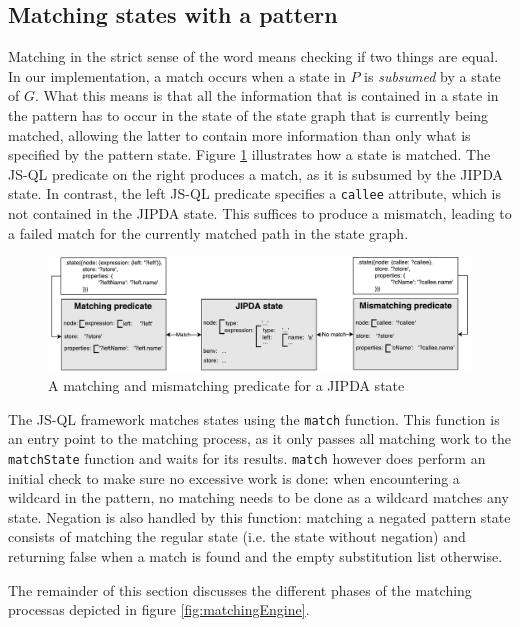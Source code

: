 \subsection{Matching states with a pattern}
\label{subsec:matching}

Matching in the strict sense of the word means checking if two things are equal. In our implementation, a match occurs when a state in $P$ is \textit{subsumed} by a state of $G$. What this means is that all the information that is contained in a state in the pattern has to occur in the state of the state graph that is currently being matched, allowing the latter to contain more information than only what is specified by the pattern state. Figure \ref{fig:matchingPredicates} illustrates how a state is matched. The JS-QL predicate on the right produces a match, as it is subsumed by the JIPDA state. In contrast, the left JS-QL predicate specifies a \texttt{callee} attribute, which is not contained in the JIPDA state. This suffices to produce a mismatch, leading to a failed match for the currently matched path in the state graph.
\begin{figure}[!h]
    \centering
      \includegraphics[width=1\textwidth]{images/matchingPredicates} 
      \caption{A matching and mismatching predicate for a JIPDA state}
    \label{fig:matchingPredicates}
\end{figure}

The JS-QL framework matches states using the \texttt{match} function. This function is an entry point to the matching process, as it only passes all matching work to the \texttt{matchState} function and waits for its results. \texttt{match} however does perform an initial check to make sure no excessive work is done: when encountering a wildcard in the pattern, no matching needs to be done as a wildcard matches any state. Negation is also handled by this function: matching a negated pattern state consists of matching the regular state (i.e. the state without negation) and returning false when a match is found and the empty substitution list otherwise. 

The remainder of this section discusses the different phases of the matching processas depicted in figure \ref{fig:matchingEngine}.



